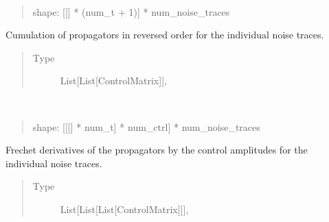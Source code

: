 \documentclass[letterpaper,10pt,english]{sphinxmanual}
\begin{document}
\begin{fulllineitems}
\begin{fulllineitems}
\begin{quote}
\begin{description}
\end{description}\end{quote}

\end{fulllineitems}


\begin{fulllineitems}
\label{\detokenize{qsim:qsim.solver_algorithms.SchroedingerSMonteCarlo._reversed_prop_noise}}~\begin{quote}

shape: {[}{[}{]} * (num\_t + 1){]} * num\_noise\_traces
\end{quote}

Cumulation of propagators in reversed order for the individual noise
traces.
\begin{quote}\begin{description}
\item[{Type}] \leavevmode
List{[}List{[}ControlMatrix{]}{]},

\end{description}\end{quote}

\end{fulllineitems}


\begin{fulllineitems}
\label{\detokenize{qsim:qsim.solver_algorithms.SchroedingerSMonteCarlo._derivative_prop_noise}}~\begin{quote}

shape: {[}{[}{[}{]} * num\_t{]} * num\_ctrl{]} * num\_noise\_traces
\end{quote}

Frechet derivatives of the propagators by the control amplitudes for
the individual noise traces.
\begin{quote}\begin{description}
\item[{Type}] \leavevmode
List{[}List{[}List{[}ControlMatrix{]}{]}{]},

\end{description}\end{quote}


\end{fulllineitems}
\end{fulllineitems}
\end{document}
